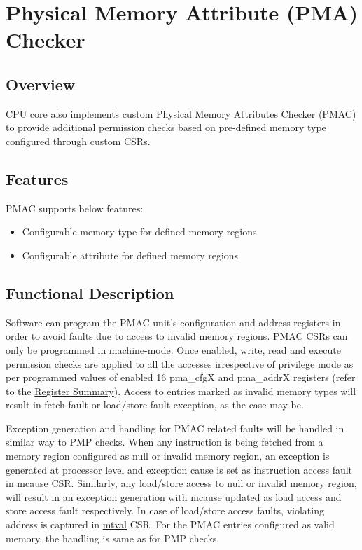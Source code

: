 \documentclass[main\_\_EN.tex]{subfiles}
\begin{document}
\clearpage
\section{Physical Memory Attribute (PMA) Checker}
\label{sec:riscvcpu-pma}

\subsection{Overview}
\label{sec:riscvcpu-pma-overview}
CPU core also implements custom Physical Memory Attributes Checker (PMAC) to provide additional permission checks based on pre-defined memory type configured through custom CSRs.


\subsection{Features}
\label{sec:riscvcpu-pma-features}
 PMAC supports below features:
 \begin{itemize}
    \item Configurable memory type for defined memory regions
    \item Configurable attribute for defined memory regions
\end{itemize}
\subsection{Functional Description}
\label{sec:riscvcpu-pma-func-descr}

Software can program the PMAC unit's configuration and address registers in order to avoid faults due to access to invalid memory regions. PMAC CSRs can only be programmed in machine-mode. Once enabled, write, read and execute permission checks are applied to all the accesses irrespective of privilege mode as per programmed values of enabled 16 pma\_cfgX and pma\_addrX registers (refer to the \hyperref[sec:riscvcpu-pma-reg-summ]{Register Summary}). Access to entries marked as invalid memory types will result in fetch fault or load/store fault exception, as the case may be.

Exception generation and handling for PMAC related faults will be handled in similar way to PMP checks. When any instruction is being fetched from a memory region configured as null or invalid memory region, an exception is generated at processor level and exception cause is set as instruction access fault in \hyperref[regdesc:MCAUSE]{mcause} CSR. Similarly, any load/store access to null or invalid memory region, will result in an exception generation with \hyperref[regdesc:MCAUSE]{mcause} updated as load access and store access fault respectively. In case of load/store access faults, violating address is captured in \hyperref[regdesc:MTVAL]{mtval} CSR. For the PMAC entries configured as valid memory, the handling is same as for PMP checks.
\end{document}
